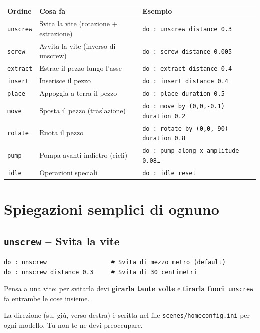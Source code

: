 ﻿\documentclass[a4paper,12pt,oneside]{book}
\newcommand{\val}[1]{\texttt{\color{cvtgreen}#1}}
\newcommand{\file}[1]{\texttt{#1}}
\begin{document}
\begin{longtable}{@{}lp{6cm}p{6cm}@{}}
\toprule
\textbf{Ordine} & \textbf{Cosa fa} & \textbf{Esempio} \\
\midrule
\val{unscrew} & Svita la vite (rotazione + estrazione) & \texttt{do : unscrew distance 0.3} \\
\val{screw} & Avvita la vite (inverso di unscrew) & \texttt{do : screw distance 0.005} \\
\val{extract} & Estrae il pezzo lungo l'asse & \texttt{do : extract distance 0.4} \\
\val{insert} & Inserisce il pezzo & \texttt{do : insert distance 0.4} \\
\val{place} & Appoggia a terra il pezzo & \texttt{do : place duration 0.5} \\
\val{move} & Sposta il pezzo (traslazione) & \texttt{do : move by (0,0,-0.1) duration 0.2} \\
\val{rotate} & Ruota il pezzo & \texttt{do : rotate by (0,0,-90) duration 0.8} \\
\val{pump} & Pompa avanti-indietro (cicli) & \texttt{do : pump along x amplitude 0.08\ldots} \\
\val{idle} & Operazioni speciali & \texttt{do : idle reset} \\
\bottomrule
\end{longtable}

\section{Spiegazioni semplici di ognuno}

\subsection{\texttt{unscrew} -- Svita la vite}

\begin{lstlisting}
do : unscrew                  # Svita di mezzo metro (default)
do : unscrew distance 0.3     # Svita di 30 centimetri
\end{lstlisting}

Pensa a una vite: per svitarla devi \textbf{girarla tante volte} e
\textbf{tirarla fuori}. \val{unscrew} fa entrambe le cose insieme.

\begin{notablu}
La direzione (su, giù, verso destra) è scritta nel file
\file{scenes/homeconfig.ini} per ogni modello. Tu non te ne devi preoccupare.
\end{notablu}
\end{document}
